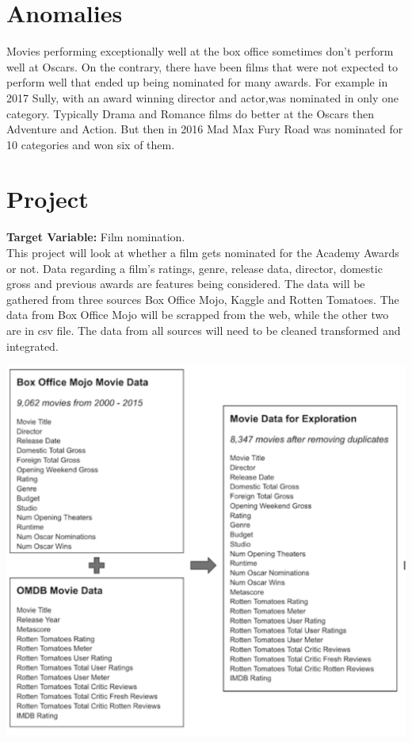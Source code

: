 \documentclass[]{report}
\begin{document}
\section*{Anomalies}

Movies performing exceptionally well at the box office sometimes don’t perform well at Oscars. On the contrary, there have been films that were not expected to perform well that ended up being nominated for many awards. For example in 2017 Sully, with an award winning director and actor,was nominated in only one category. Typically Drama and Romance films do better at the Oscars then Adventure and Action. But then in 2016 Mad Max Fury Road was nominated for 10
categories and won six of them.

\section*{Project}


\textbf{Target Variable: } Film nomination.\\

This project will look at whether a film gets nominated for the Academy Awards or not. Data regarding a film's ratings, genre, release data, director,
domestic gross and previous awards are features being considered. The data will be gathered from three sources Box Office Mojo, Kaggle and Rotten Tomatoes. 
The data from Box Office Mojo will be scrapped from the web, while the other two are in csv file. The data from all sources will need to be cleaned
transformed and integrated.


\includegraphics[scale=.75]{fds_image}
\end{document}
